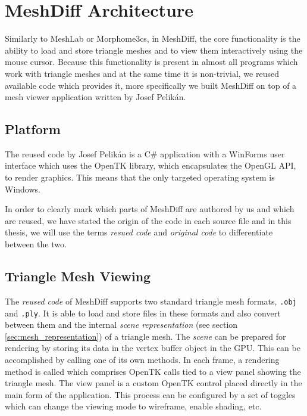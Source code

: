 \section{MeshDiff Architecture}

Similarly to MeshLab or Morphome3cs, in MeshDiff, the core functionality is the ability to load and store triangle meshes and to view them interactively using the mouse cursor. Because this functionality is present in almost all programs which work with triangle meshes and at the same time it is non-trivial, we reused available code which provides it, more specifically we built MeshDiff on top of a mesh viewer application written by Josef Pelikán.

\subsection{Platform}

The reused code by Josef Pelikán is a C\# application with a WinForms user interface which uses the OpenTK library, which encapsulates the OpenGL API, to render graphics. This means that the only targeted operating system is Windows.

In order to clearly mark which parts of MeshDiff are authored by us and which are reused, we have stated the origin of the code in each source file and in this thesis, we will use the terms {\it resued code} and {\it original code} to differentiate between the two.

\subsection{Triangle Mesh Viewing}

The {\it reused code} of MeshDiff supports two standard triangle mesh formats, \verb+.obj+ and \verb+.ply+. It is able to load and store files in these formats and also convert between them and the internal {\it scene representation} (see section \ref{sec:mesh_representation}) of a triangle mesh. The {\it scene} can be prepared for rendering by storing its data in the vertex buffer object in the GPU. This can be accomplished by calling one of its own methods. In each frame, a rendering method is called which comprises OpenTK calls tied to a view panel showing the triangle mesh. The view panel is a custom OpenTK control placed directly in the main form of the application. This process can be configured by a set of toggles which can change the viewing mode to wireframe, enable shading, etc.

